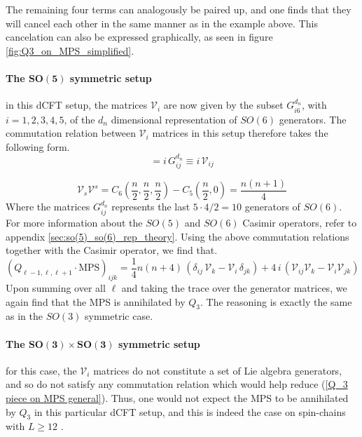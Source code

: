%
%
The remaining four terms can analogously be paired up, and one finds that they will cancel each other in the same manner as in the example above. This cancelation can also be expressed graphically, as seen in figure \ref{fig:Q3_on_MPS_simplified}.

\newpage
\paragraph[The $SO(5)$ symmetric setup]{The $\mathbf{SO(5)}$ symmetric setup}
in this dCFT setup, the matrices $\mathcal{V}_i$ are now given by the subset $G_{i6}^{d_n}$, with $i=1,2,3,4,5$, of the $d_n$ dimensional representation of $SO(6)$ generators. The commutation relation between $\mathcal{V}_i$ matrices in this setup therefore takes the following form.
%
%
\begin{equation}
[\mathcal{V}_i, \mathcal{V}_j] = i \, G_{ij}^{d_n} \equiv i \, \mathcal{V}_{ij}
\end{equation}
%
%

%
%
\begin{equation}
\mathcal{V}_s \mathcal{V}^s
=
C_6 \left( \frac{n}{2}, \frac{n}{2}, \frac{n}{2} \right)
- C_5 \left( \frac{n}{2}, 0 \right)
=
\frac{n (n + 1)}{4}
\end{equation}
%
%
Where the matrices $G_{ij}^{d_n}$ represents the last $5 \cdot 4 / 2 = 10$ generators of $SO(6)$. For more information about the $SO(5)$ and $SO(6)$ Casimir operators, refer to appendix \ref{sec:so(5)_so(6)_rep_theory}. Using the above commutation relations together with the Casimir operator, we find that.
%
%
\begin{equation}
(Q_{\ell-1,\ell,\ell+1} \cdot \text{MPS})_{ijk}
=
\frac{1}{4} n (n + 4) \, (\delta_{ij} \, \mathcal{V}_k - \mathcal{V}_i \, \delta_{jk})
+
4 \, i \, (\mathcal{V}_{ij} \mathcal{V}_k - \mathcal{V}_i \mathcal{V}_{jk})
\end{equation}
%
%
Upon summing over all $\ell$ and taking the trace over the generator matrices, we again find that the MPS is annihilated by $Q_3$. The reasoning is exactly the same as in the $SO(3)$ symmetric case.

\paragraph[The $SO(3) \times SO(3)$ symmetric setup]{The $\mathbf{SO(3) \times SO(3)}$ symmetric setup}
for this case, the $\mathcal{V}_i$ matrices do not constitute a set of Lie algebra generators, and so do not satisfy any commutation relation which would help reduce (\ref{Q_3 piece on MPS general}). Thus, one would not expect the MPS to be annihilated by $Q_3$ in this particular dCFT setup, and this is indeed the case on spin-chains with $L \geq 12$ \cite{Lack of integrability in SO(3)xSO(3)}. 


